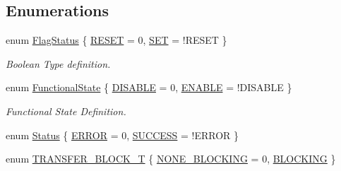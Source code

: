 \subsection*{Enumerations}
\begin{DoxyCompactItemize}
\item 
enum \hyperlink{group___l_p_c___types___public___types_ga89136caac2e14c55151f527ac02daaff}{Flag\+Status} \{ \hyperlink{group___l_p_c___types___public___types_gga89136caac2e14c55151f527ac02daaffa589b7d94a3d91d145720e2fed0eb3a05}{R\+E\+S\+ET} = 0, 
\hyperlink{group___l_p_c___types___public___types_gga89136caac2e14c55151f527ac02daaffab44c8101cc294c074709ec1b14211792}{S\+ET} = !\+R\+E\+S\+ET
 \}\begin{DoxyCompactList}\small\item\em Boolean Type definition. \end{DoxyCompactList}
\item 
enum \hyperlink{group___l_p_c___types___public___types_gac9a7e9a35d2513ec15c3b537aaa4fba1}{Functional\+State} \{ \hyperlink{group___l_p_c___types___public___types_ggac9a7e9a35d2513ec15c3b537aaa4fba1ad3a9df141be0ccf10389b640f492b26d}{D\+I\+S\+A\+B\+LE} = 0, 
\hyperlink{group___l_p_c___types___public___types_ggac9a7e9a35d2513ec15c3b537aaa4fba1a7d46875fa3ebd2c34d2756950eda83bf}{E\+N\+A\+B\+LE} = !\+D\+I\+S\+A\+B\+LE
 \}\begin{DoxyCompactList}\small\item\em Functional State Definition. \end{DoxyCompactList}
\item 
enum \hyperlink{group___l_p_c___types___public___types_ga67a0db04d321a74b7e7fcfd3f1a3f70b}{Status} \{ \hyperlink{group___l_p_c___types___public___types_gga67a0db04d321a74b7e7fcfd3f1a3f70ba2fd6f336d08340583bd620a7f5694c90}{E\+R\+R\+OR} = 0, 
\hyperlink{group___l_p_c___types___public___types_gga67a0db04d321a74b7e7fcfd3f1a3f70bac7f69f7c9e5aea9b8f54cf02870e2bf8}{S\+U\+C\+C\+E\+SS} = !\+E\+R\+R\+OR
 \}
\item 
enum \hyperlink{group___l_p_c___types___public___types_gaf5297347bed33665c55dd0e9c7840403}{T\+R\+A\+N\+S\+F\+E\+R\+\_\+\+B\+L\+O\+C\+K\+\_\+T} \{ \hyperlink{group___l_p_c___types___public___types_ggaf5297347bed33665c55dd0e9c7840403ae00130e64382c35d172d226b79aa9acb}{N\+O\+N\+E\+\_\+\+B\+L\+O\+C\+K\+I\+NG} = 0, 
\hyperlink{group___l_p_c___types___public___types_ggaf5297347bed33665c55dd0e9c7840403a854a1cd6e3a98db9e290dddea29725e7}{B\+L\+O\+C\+K\+I\+NG}
 \}
\end{DoxyCompactItemize}


